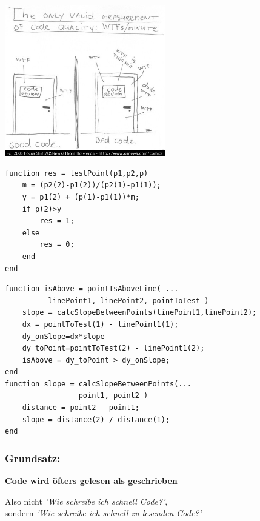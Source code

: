 \documentclass[handout]{beamer}
\begin{document}
\begin{frame}
    \begin{center}
        \includegraphics[width=7cm]{wtfm.jpg}
    \end{center}
\end{frame}

\begin{frame}[fragile]
\begin{minipage}[t]{0.49\linewidth}
    \begin{lstlisting}[basicstyle=\tiny]
function res = testPoint(p1,p2,p)
    m = (p2(2)-p1(2))/(p2(1)-p1(1));
    y = p1(2) + (p(1)-p1(1))*m;
    if p(2)>y
        res = 1;
    else
        res = 0;
    end
end
\end{lstlisting}
\end{minipage}
\begin{minipage}[t]{0.49\linewidth}
    \begin{lstlisting}[basicstyle=\tiny]
function isAbove = pointIsAboveLine( ...
          linePoint1, linePoint2, pointToTest )
    slope = calcSlopeBetweenPoints(linePoint1,linePoint2);
    dx = pointToTest(1) - linePoint1(1);
    dy_onSlope=dx*slope
    dy_toPoint=pointToTest(2) - linePoint1(2);
    isAbove = dy_toPoint > dy_onSlope;
end
function slope = calcSlopeBetweenPoints(...
                 point1, point2 )
    distance = point2 - point1;
    slope = distance(2) / distance(1);
end
\end{lstlisting}
        
\end{minipage}
\end{frame}

\begin{frame}
    \frametitle{Grundsatz:}
    \begin{center}
        \huge \bf Code wird öfters gelesen als geschrieben
    \end{center}
    \vspace{2em}\pause
    Also nicht \textit{'Wie schreibe ich schnell Code?'}, \\
    sondern \textit{'Wie schreibe ich schnell zu lesenden Code?'}
\end{frame}
\end{document}
